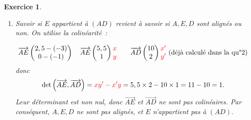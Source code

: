 \documentclass[10pt]{article}
\newtheorem{exo}{Exercice}
\begin{document}
\begin{exo}
\begin{enumerate}
\item Savoir si $E$ appartient à $(AD)$ revient à savoir si $A,E,D$ sont alignés ou non. On utilise la colinéarité~:

\[\overrightarrow{AE}\begin{pmatrix} 2,5-(-3)\\0-(-1) \end{pmatrix}\quad \overrightarrow{AE}\begin{pmatrix} 5,5\\1 \end{pmatrix}\begin{matrix} \textcolor{red}{
x}\\\textcolor{red}{
y} \end{matrix}\qquad
\overrightarrow{AD}\begin{pmatrix} 10\\2 \end{pmatrix}\begin{matrix} \textcolor{red}{
x'}\\\textcolor{red}{
y'}\end{matrix}~\text{(déjà calculé dans la qu°2)}\]
donc
\[\det\left(\overrightarrow{AE},\overrightarrow{AD}\right)=\textcolor{red}{
xy'-x'y}=5,5\times 2-10\times 1=11-10=1.\] Leur déterminant est non 
nul, donc $\overrightarrow{AE}$ et $\overrightarrow{AD}$ ne sont pas colinéaires. Par conséquent, $A,E,D$ ne sont pas alignés, et $E$ n'appartient pas à $(AD).$
\end{enumerate}

\end{exo}

\newpage
\end{document}
